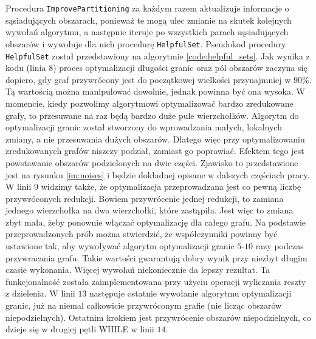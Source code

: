 Procedura \texttt{ImprovePartitioning} za każdym razem aktualizuje informacje o sąsiadujących obszarach, ponieważ
te mogą ulec zmianie na skutek kolejnych wywołań algorytmu, a następnie iteruje po wszystkich parach sąsiadujących obszarów i wywołuje
dla nich procedurę \texttt{HelpfulSet}.
Pseudokod procedury \texttt{HelpfulSet} został przedstawiony na algorytmie \ref{code:helpful_sets}.
Jak wynika z kodu (linia $8$) proces optymalizacji długości granic oraz pól obszarów zaczyna się dopiero,
gdy graf przywrócony jest do początkowej wielkości przynajmniej w $90\%$.
Tą wartością można manipulować dowolnie, jednak powinna być ona wysoka.
W momencie, kiedy pozwolimy algorytmowi optymalizować bardzo zredukowane grafy, to przesuwane na raz będą bardzo
duże pule wierzchołków.
Algorytm do optymalizacji granic został stworzony do wprowadzania małych, lokalnych zmiany, a nie przesuwania dużych obszarów.
Dlatego więc przy optymalizowaniu zredukowanych grafów niszczy podział, zamiast go poprawiać.
Efektem tego jest powstawanie obszarów podzielonych na dwie części.
Zjawisko to przedstawione jest na rysunku \ref{im:noises} i będzie dokładnej opisane w dalszych częściach pracy.
W linii $9$ widzimy także, że optymalizacja przeprowadzana jest co pewną liczbę przywróconych redukcji.
Bowiem przywrócenie jednej redukcji, to zamiana jednego wierzchołka na dwa wierzchołki, które zastąpiła.
Jest więc to zmiana zbyt mała, żeby ponownie włączać optymalizację dla całego grafu.
Na podstawie przeprowadzonych prób można stwierdzić, że współczynniki powinny być ustawione tak, aby wywoływać
algorytm optymalizacji granic $5$-$10$ razy podczas przywracania grafu.
Takie wartości gwarantują dobry wynik przy niezbyt długim czasie wykonania.
Więcej wywołań niekoniecznie da lepszy rezultat.
Ta funkcjonalność została zaimplementowana przy użyciu operacji wyliczania reszty z dzielenia.
W linii $13$ następuje ostatnie wywołanie algorytmu optymalizacji granic, już na niemal całkowicie przywróconym grafie
(nie licząc obszarów niepodzielnych).
Ostatnim krokiem jest przywrócenie obszarów niepodzielnych, co dzieje się w drugiej pętli WHILE
w linii $14$.